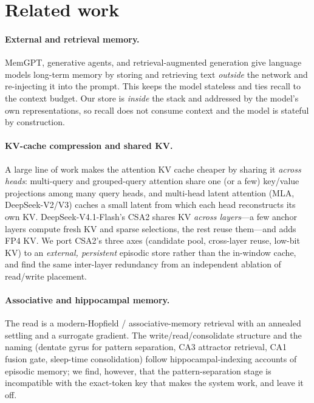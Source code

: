 \section{Related work}
\label{sec:related}

\paragraph{External and retrieval memory.} MemGPT, generative agents, and
retrieval-augmented generation give language models long-term memory by storing and
retrieving text \emph{outside} the network and re-injecting it into the prompt.
This keeps the model stateless and ties recall to the context budget. Our store is
\emph{inside} the stack and addressed by the model's own representations, so recall
does not consume context and the model is stateful by construction.

\paragraph{KV-cache compression and shared KV.} A large line of work makes the
attention KV cache cheaper by sharing it \emph{across heads}: multi-query and
grouped-query attention share one (or a few) key/value projections among many query
heads, and multi-head latent attention (MLA, DeepSeek-V2/V3) caches a small latent
from which each head reconstructs its own KV. DeepSeek-V4.1-Flash's CSA2 shares KV
\emph{across layers}---a few anchor layers compute fresh KV and sparse selections,
the rest reuse them---and adds FP4 KV. We port CSA2's three axes (candidate pool,
cross-layer reuse, low-bit KV) to an \emph{external, persistent} episodic store
rather than the in-window cache, and find the same inter-layer redundancy from an
independent ablation of read/write placement.

\paragraph{Associative and hippocampal memory.} The read is a modern-Hopfield /
associative-memory retrieval with an annealed settling and a surrogate gradient.
The write/read/consolidate structure and the naming (dentate gyrus for pattern
separation, CA3 attractor retrieval, CA1 fusion gate, sleep-time consolidation)
follow hippocampal-indexing accounts of episodic memory; we find, however, that the
pattern-separation stage is incompatible with the exact-token key that makes the
system work, and leave it off.

